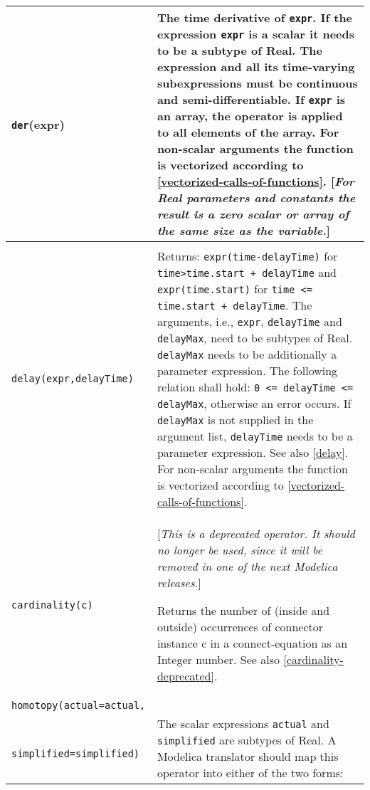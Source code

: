 \begin{longtable}{|p{5.1cm}|p{8cm}|}
\hline \endhead

\lstinline!der!(expr) &
The time derivative of \lstinline!expr!. If the expression \lstinline!expr! is a
scalar it needs to be a subtype of Real. The expression and all its
time-varying subexpressions must be continuous and semi-differentiable.
If \lstinline!expr! is an array, the operator
is applied to all elements of the array. For non-scalar arguments the
function is vectorized according to \autoref{vectorized-calls-of-functions}. {[}\emph{For Real
parameters and constants the result is a zero scalar or array of the
same size as the variable.}{]}\\
\hline

\begin{tabular}{@{}p{5.1cm}@{}}

\lstinline!delay(expr,delayTime,delayMax)!\\
\lstinline!delay(expr,delayTime)!
\end{tabular} &
Returns: \lstinline!expr(time-delayTime)! for \lstinline!time>time.start + delayTime! and \lstinline!expr(time.start)! for \lstinline!time <= time.start + delayTime!. The arguments, i.e., \lstinline!expr!, \lstinline!delayTime! and \lstinline!delayMax!, need to be
subtypes of Real. \lstinline!delayMax! needs to be additionally a parameter
expression. The following relation shall hold: \lstinline!0 <= delayTime <= delayMax!, otherwise an error occurs. If \lstinline!delayMax! is not
supplied in the argument list, \lstinline!delayTime! needs to be a parameter
expression. See also \autoref{delay}. For non-scalar arguments the
function is vectorized according to \autoref{vectorized-calls-of-functions}.\\
\hline

\lstinline!cardinality(c)! & {[}\emph{This is a deprecated operator. It should no longer be used,
since it will be removed in one of the next Modelica releases.}{]}

Returns the number of (inside and outside) occurrences of connector
instance c in a connect-equation as an Integer number. See also \autoref{cardinality-deprecated}.\\
\hline

\lstinline!homotopy(actual=actual,!\\
\lstinline!   simplified=simplified)! & The scalar expressions \lstinline!actual! and \lstinline!simplified! are subtypes of
Real. A Modelica translator should map this operator into either of the
two forms:


\end{longtable}
